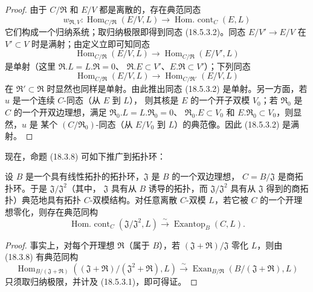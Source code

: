 \begin{proof}
由于 $C/\mathfrak R$ 和 $E/V$ 都是离散的，存在典范同态
\[
  w_{\mathfrak R,V}:\operatorname{Hom}_{C/\mathfrak R}(E/V,L)
  \longrightarrow\operatorname{Hom.\ cont}_C(E,L)
\]
它们构成一个归纳系统；取归纳极限即得到同态 (18.5.3.2)。同态
$E/V'\to E/V$ 在 $V'\subset V$ 时是满射；由定义立即可知同态
\[
  \operatorname{Hom}_{C/\mathfrak R}(E/V,L)
  \longrightarrow\operatorname{Hom}_{C/\mathfrak R}(E/V',L)
\]
是单射（这里 $\mathfrak R.L=L.\mathfrak R=0$、
$\mathfrak R.E\subset V'$、$E.\mathfrak R\subset V'$）；下列同态
\[
  \operatorname{Hom}_{C/\mathfrak R}(E/V,L)
  \longrightarrow\operatorname{Hom}_{C/\mathfrak R'}(E/V,L)
\]
在 $\mathfrak R'\subset\mathfrak R$ 时显然也同样是单射。由此推出同态
(18.5.3.2) 是单射。另一方面，若 $u$ 是一个连续 $C$-同态（从 $E$ 到 $L$），
则其核是 $E$ 的一个开子双模 $V_0$；若 $\mathfrak R_0$ 是
$C$ 的一个开双边理想，满足 $\mathfrak R_0.L=L.\mathfrak R_0=0$、
$\mathfrak R_0.E\subset V_0$ 和 $E.\mathfrak R_0\subset V_0$，则显然，$u$ 是
某个 $(C/\mathfrak R_0)$-同态（从 $E/V_0$ 到 $L$）的典范像。因此
(18.5.3.2) 是满射。
\end{proof}

现在，命题 (18.3.8) 可如下推广到拓扑环：

\begin{proposition}[18.5.4]
\label{0.18.5.4-fr}
设 $B$ 是一个具有线性拓扑的拓扑环，$\mathfrak J$ 是 $B$ 的一个双边理想，
$C=B/\mathfrak J$ 是商拓扑环。于是 $\mathfrak J/\mathfrak J^2$（其中，
$\mathfrak J$ 具有从 $B$ 诱导的拓扑，而 $\mathfrak J/\mathfrak J^2$ 具有从
$\mathfrak J$ 得到的商拓扑）典范地具有拓扑 $C$-双模结构。对任意离散
$C$-双模 $L$，若它被 $C$ 的一个开理想零化，则存在典范同构
\begin{equation}
\label{0.18.5.4.1-fr}
\tag{18.5.4.1}
  \operatorname{Hom.\ cont}_C(\mathfrak J/\mathfrak J^2,L)
  \xrightarrow{\sim}\operatorname{Exantop}_B(C,L).
\end{equation}
\end{proposition}

\begin{proof}
事实上，对每个开理想 $\mathfrak R$（属于 $B$），若
$(\mathfrak J+\mathfrak R)/\mathfrak J$ 零化 $L$，则由 (18.3.8) 有典范同构
\[
  \operatorname{Hom}_{B/(\mathfrak J+\mathfrak R)}
    ((\mathfrak J+\mathfrak R)/(\mathfrak J^2+\mathfrak R),L)
  \xrightarrow{\sim}
  \operatorname{Exan}_{B/\mathfrak R}(B/(\mathfrak J+\mathfrak R),L)
\]
只须取归纳极限，并计及 (18.5.3.1)，即可得证。
\end{proof}

